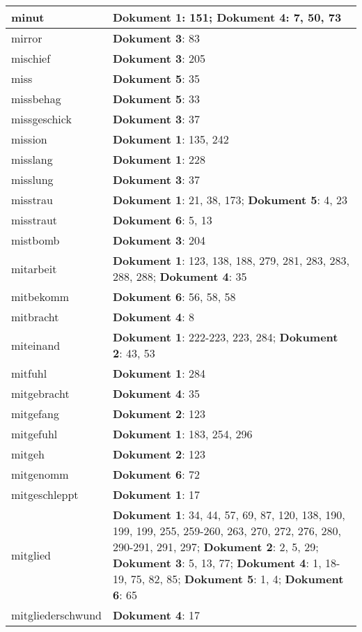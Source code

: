 \documentclass[a5paper]{article}
\begin{document}
\begin{longtable}[l]{|l|p{3in}|}
\hline
minut & \textbf{Dokument 1}: 151; \textbf{Dokument 4}: 7, 50, 73 \\
\hline
mirror & \textbf{Dokument 3}: 83 \\
\hline
mischief & \textbf{Dokument 3}: 205 \\
\hline
miss & \textbf{Dokument 5}: 35 \\
\hline
missbehag & \textbf{Dokument 5}: 33 \\
\hline
missgeschick & \textbf{Dokument 3}: 37 \\
\hline
mission & \textbf{Dokument 1}: 135, 242 \\
\hline
misslang & \textbf{Dokument 1}: 228 \\
\hline
misslung & \textbf{Dokument 3}: 37 \\
\hline
misstrau & \textbf{Dokument 1}: 21, 38, 173; \textbf{Dokument 5}: 4, 23 \\
\hline
misstraut & \textbf{Dokument 6}: 5, 13 \\
\hline
mistbomb & \textbf{Dokument 3}: 204 \\
\hline
mitarbeit & \textbf{Dokument 1}: 123, 138, 188, 279, 281, 283, 283, 288, 288; \textbf{Dokument 4}: 35 \\
\hline
mitbekomm & \textbf{Dokument 6}: 56, 58, 58 \\
\hline
mitbracht & \textbf{Dokument 4}: 8 \\
\hline
miteinand & \textbf{Dokument 1}: 222-223, 223, 284; \textbf{Dokument 2}: 43, 53 \\
\hline
mitfuhl & \textbf{Dokument 1}: 284 \\
\hline
mitgebracht & \textbf{Dokument 4}: 35 \\
\hline
mitgefang & \textbf{Dokument 2}: 123 \\
\hline
mitgefuhl & \textbf{Dokument 1}: 183, 254, 296 \\
\hline
mitgeh & \textbf{Dokument 2}: 123 \\
\hline
mitgenomm & \textbf{Dokument 6}: 72 \\
\hline
mitgeschleppt & \textbf{Dokument 1}: 17 \\
\hline
mitglied & \textbf{Dokument 1}: 34, 44, 57, 69, 87, 120, 138, 190, 199, 199, 255, 259-260, 263, 270, 272, 276, 280, 290-291, 291, 297; \textbf{Dokument 2}: 2, 5, 29; \textbf{Dokument 3}: 5, 13, 77; \textbf{Dokument 4}: 1, 18-19, 75, 82, 85; \textbf{Dokument 5}: 1, 4; \textbf{Dokument 6}: 65 \\
\hline
mitgliederschwund & \textbf{Dokument 4}: 17 \\

\end{longtable}
\end{document}
